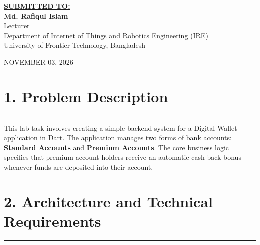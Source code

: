 \documentclass[11pt,a4paper]{article}
\begin{document}
\begin{titlepage}
    {\small \textbf{\underline{SUBMITTED TO:}}}\\[0.22cm]
    {\large \textbf{Md. Rafiqul Islam}}\\[0.14cm]
    {\small Lecturer}\\[0.1cm]
    {\footnotesize Department of Internet of Things and Robotics Engineering (IRE)}\\[0.08cm]
    {\footnotesize University of Frontier Technology, Bangladesh}

    \vfill
    {\footnotesize NOVEMBER 03, 2026}
    \vspace*{0.3cm}
\end{titlepage}

\newpage
{}

\section*{1. Problem Description}
\noindent\rule{\textwidth}{0.5pt}\vspace{0.15cm}

This lab task involves creating a simple backend system for a Digital Wallet application in Dart. The application manages two forms of bank accounts: \textbf{Standard Accounts} and \textbf{Premium Accounts}. The core business logic specifies that premium account holders receive an automatic cash-back bonus whenever funds are deposited into their account.

\vspace{0.25cm}
\section*{2. Architecture and Technical Requirements}
\noindent\rule{\textwidth}{0.5pt}\vspace{0.15cm}
\end{document}
